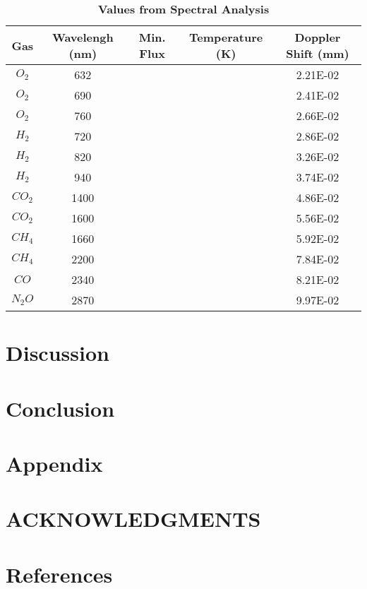 \documentclass[reprint,english,notitlepage]{revtex4-2}
\begin{document}
\begin{table}[h] \label{tab: Spec anal}
\caption{\bf{Values from Spectral Analysis}}
    \begin{tabular}{|c|*{4}{c|}}
        \hline
        Gas  &Wavelengh (nm) &Min. Flux &Temperature (K) &Doppler Shift (mm) \\
        \hline
        $ O_{2} $ &632 & & &2.21E-02 \\
        \hline
        $ O_{2} $ &690 & & &2.41E-02 \\
        \hline
        $ O_{2} $ &760 & & &2.66E-02 \\
        \hline
        $ H_{2} $ &720 & & &2.86E-02 \\
        \hline
        $ H_{2} $ &820 & & &3.26E-02 \\
        \hline
        $ H_{2} $ &940 & & &3.74E-02 \\
        \hline
        $ CO_{2} $ &1400 & & &4.86E-02 \\
        \hline
        $ CO_{2} $ &1600 & & &5.56E-02 \\
        \hline
        $ CH_{4} $ &1660 & & &5.92E-02 \\
        \hline
        $ CH_{4} $ &2200 & & &7.84E-02 \\
        \hline
        $ CO $ &2340 & & &8.21E-02 \\
        \hline
        $ N_{2}O $ &2870 & & &9.97E-02 \\
        \hline
        \end{tabular}

\end{table}
\twocolumngrid


\section{Discussion} \label{sec: discussion}

\section{Conclusion} \label{sec: conclusion}

\section{Appendix} \label{sec: appendix}

\section*{ACKNOWLEDGMENTS}

\section*{References} \label{sec: references}
\end{document}
